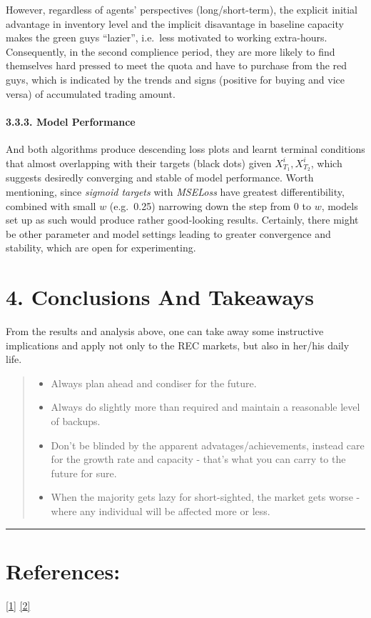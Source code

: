 \documentclass[
]{article}
\providecommand{\tightlist}{%
  \setlength{\itemsep}{0pt}\setlength{\parskip}{0pt}}
\begin{document}
However, regardless of agents' perspectives (long/short-term), the
explicit initial advantage in inventory level and the implicit
disavantage in baseline capacity makes the green guys ``lazier'',
i.e.~less motivated to working extra-hours. Consequently, in the second
complience period, they are more likely to find themselves hard pressed
to meet the quota and have to purchase from the red guys, which is
indicated by the trends and signs (positive for buying and vice versa)
of accumulated trading amount.

\hypertarget{model-performance}{%
\paragraph{3.3.3. Model Performance}\label{model-performance}}

And both algorithms produce descending loss plots and learnt terminal
conditions that almost overlapping with their targets (black dots) given
\(X_{T_1}^i, X_{T_2}^i\), which suggests desiredly converging and stable
of model performance. Worth mentioning, since \emph{sigmoid targets}
with \emph{MSELoss} have greatest differentibility, combined with small
\(w\) (e.g.~0.25) narrowing down the step from 0 to \(w\), models set up
as such would produce rather good-looking results. Certainly, there
might be other parameter and model settings leading to greater
convergence and stability, which are open for experimenting.

\hypertarget{conclusions-and-takeaways}{%
\section{4. Conclusions And Takeaways}\label{conclusions-and-takeaways}}

From the results and analysis above, one can take away some instructive
implications and apply not only to the REC markets, but also in her/his
daily life.

\begin{quote}
\begin{itemize}
\tightlist
\item
  Always plan ahead and condiser for the future.
\item
  Always do slightly more than required and maintain a reasonable level
  of backups.
\item
  Don't be blinded by the apparent advatages/achievements, instead care
  for the growth rate and capacity - that's what you can carry to the
  future for sure.
\item
  When the majority gets lazy for short-sighted, the market gets worse -
  where any individual will be affected more or less.
\end{itemize}
\end{quote}

\begin{center}\rule{0.5\linewidth}{0.5pt}\end{center}

\hypertarget{references}{%
\section{References:}\label{references}}

\href{https://doi.org/10.48550/arXiv.2110.01127}{{[}1{]}}
\href{https://arxiv.org/abs/1210.5780}{{[}2{]}}
\end{document}
